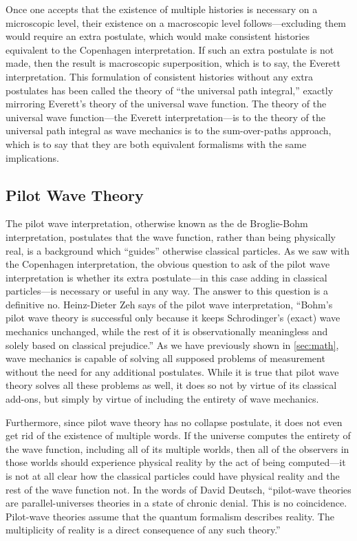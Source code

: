 \documentclass[
    12pt,
    letterpaper,
    aps,
    prd,
    longbibliography,
    twocolumn,
    nofootinbib,
    raggedbottom,
    amsmath,
    amssymb,
    amsfonts,
]{revtex4-1}
\begin{document}
Once one accepts that the existence of multiple histories is necessary on a microscopic level, their existence on a macroscopic level follows---excluding them would require an extra postulate, which would make consistent histories equivalent to the Copenhagen interpretation. If such an extra postulate is not made, then the result is macroscopic superposition, which is to say, the Everett interpretation. This formulation of consistent histories without any extra postulates has been called the theory of ``the universal path integral,'' exactly mirroring Everett's theory of the universal wave function.\cite{pathintegral} The theory of the universal wave function---the Everett interpretation---is to the theory of the universal path integral as wave mechanics is to the sum-over-paths approach, which is to say that they are both equivalent formalisms with the same implications.

\subsection{Pilot Wave Theory}

The pilot wave interpretation, otherwise known as the de Broglie-Bohm interpretation, postulates that the wave function, rather than being physically real, is a background which ``guides'' otherwise classical particles.\cite{bohm} As we saw with the Copenhagen interpretation, the obvious question to ask of the pilot wave interpretation is whether its extra postulate---in this case adding in classical particles---is necessary or useful in any way. The answer to this question is a definitive no. Heinz-Dieter Zeh says of the pilot wave interpretation, ``Bohm's pilot wave theory is successful only because it keeps Schrodinger's (exact) wave mechanics unchanged, while the rest of it is observationally meaningless and solely based on classical prejudice.''\cite{zehbohm} As we have previously shown in \autoref{sec:math}, wave mechanics is capable of solving all supposed problems of measurement without the need for any additional postulates. While it is true that pilot wave theory solves all these problems as well, it does so not by virtue of its classical add-ons, but simply by virtue of including the entirety of wave mechanics.\cite{zehbohm}\cite{wallacebohm}

Furthermore, since pilot wave theory has no collapse postulate, it does not even get rid of the existence of multiple words. If the universe computes the entirety of the wave function, including all of its multiple worlds, then all of the observers in those worlds should experience physical reality by the act of being computed---it is not at all clear how the classical particles could have physical reality and the rest of the wave function not.\cite{everetttaboo}\cite{zehbohm} In the words of David Deutsch, ``pilot-wave theories are parallel-universes theories in a state of chronic denial. This is no coincidence. Pilot-wave theories assume that the quantum formalism describes reality. The multiplicity of reality is a direct consequence of any such theory.''\cite{everetttaboo}
\end{document}
